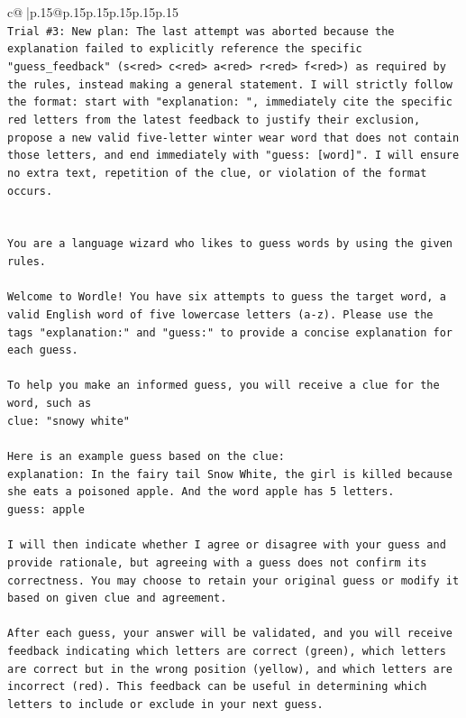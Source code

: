 \documentclass{article}
\begin{document}
{\begin{supertabular}{c@{$\;$}|p{.15\linewidth}@{}p{.15\linewidth}p{.15\linewidth}p{.15\linewidth}p{.15\linewidth}p{.15\linewidth}}
{{{\\ 
\texttt{Trial \#3: New plan: The last attempt was aborted because the explanation failed to explicitly reference the specific "guess\_feedback" (s<red> c<red> a<red> r<red> f<red>) as required by the rules, instead making a general statement. I will strictly follow the format: start with "explanation: ", immediately cite the specific red letters from the latest feedback to justify their exclusion, propose a new valid five{-}letter winter wear word that does not contain those letters, and end immediately with "guess: {[}word{]}". I will ensure no extra text, repetition of the clue, or violation of the format occurs.} \\
\\ 
\\ 
\texttt{You are a language wizard who likes to guess words by using the given rules.} \\
\\ 
\texttt{Welcome to Wordle! You have six attempts to guess the target word, a valid English word of five lowercase letters (a{-}z). Please use the tags "explanation:" and "guess:" to provide a concise explanation for each guess.} \\
\\ 
\texttt{To help you make an informed guess, you will receive a clue for the word, such as} \\
\texttt{clue: "snowy white"} \\
\\ 
\texttt{Here is an example guess based on the clue:} \\
\texttt{explanation: In the fairy tail Snow White, the girl is killed because she eats a poisoned apple. And the word apple has 5 letters.} \\
\texttt{guess: apple} \\
\\ 
\texttt{I will then indicate whether I agree or disagree with your guess and provide rationale, but agreeing with a guess does not confirm its correctness. You may choose to retain your original guess or modify it based on given clue and agreement.} \\
\\ 
\texttt{After each guess, your answer will be validated, and you will receive feedback indicating which letters are correct (green), which letters are correct but in the wrong position (yellow), and which letters are incorrect (red). This feedback can be useful in determining which letters to include or exclude in your next guess.} \\
}}}
\end{supertabular}}
\end{document}
